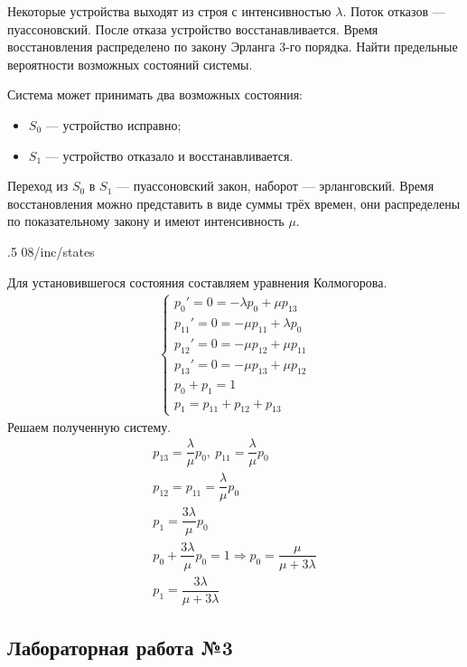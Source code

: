 Некоторые устройства выходят из строя с интенсивностью $\lambda$. Поток отказов --- пуассоновский. После отказа устройство восстанавливается. Время восстановления распределено по закону Эрланга 3-го порядка. Найти предельные вероятности возможных состояний системы.

Система может принимать два возможных состояния:

\begin{itemize}
    \item $S_0$ --- устройство исправно;
    \item $S_1$ --- устройство отказало и восстанавливается.
\end{itemize}

Переход из $S_0$ в $S_1$ --- пуассоновский закон, наборот --- эрланговский. Время восстановления можно представить в виде суммы трёх времен, они распределены по показательному закону и имеют интенсивность $\mu$.

\image
{.5\textwidth}
{08/inc/states}
{}

Для установившегося состояния составляем уравнения Колмогорова.
%
\begin{gather*}
    \begin{cases}
        p_0' = 0 = -\lambda p_0+\mu p_{13}    \\
        p_{11}' = 0 = -\mu p_{11}+\lambda p_0 \\
        p_{12}' = 0 = -\mu p_{12}+\mu p_{11}  \\
        p_{13}' = 0 = -\mu p_{13}+\mu p_{12}  \\
        p_0 + p_1 = 1                         \\
        p_1 = p_{11} + p_{12} + p_{13}
    \end{cases}
\end{gather*}
%
Решаем полученную систему.
%
\begin{gather*}
    p_{13} = \dfrac{\lambda}{\mu}p_0,\ p_{11} = \dfrac{\lambda}{\mu}p_0\\
    p_{12} = p_{11} = \dfrac{\lambda}{\mu}p_0\\
    p_1 = \dfrac{3\lambda}{\mu}p_0\\
    p_0 + \dfrac{3\lambda}{\mu}p_0 = 1\Rightarrow p_0 = \dfrac{\mu}{\mu + 3\lambda}\\
    p_1 = \dfrac{3\lambda}{\mu + 3\lambda}
\end{gather*}

\subsection{Лабораторная работа №3}

